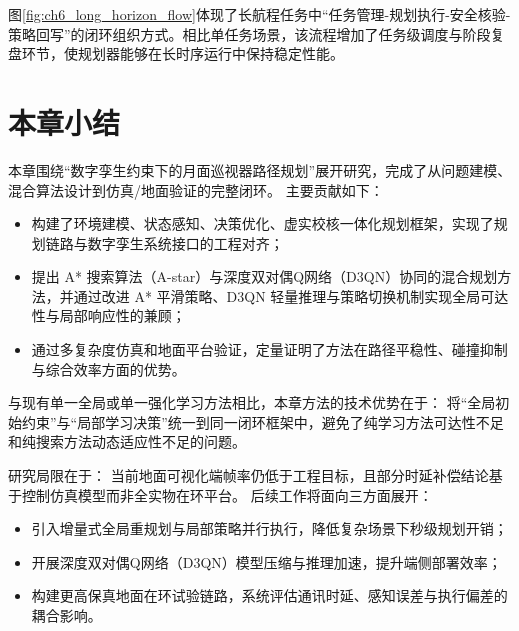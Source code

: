 \documentclass[UTF8,zihao=-4,a4paper,oneside,openany]{ctexrep}
\numberwithin{equation}{chapter}
\theoremstyle{plain}
\theoremstyle{definition}
\newenvironment{myitemize}{\begin{itemize}[noitemsep,topsep=0pt]}{\end{itemize}}
\begin{document}
图\ref{fig:ch6_long_horizon_flow}体现了长航程任务中“任务管理-规划执行-安全核验-策略回写”的闭环组织方式。相比单任务场景，该流程增加了任务级调度与阶段复盘环节，使规划器能够在长时序运行中保持稳定性能。

\section{本章小结}
\label{sec:ch6_summary}

本章围绕“数字孪生约束下的月面巡视器路径规划”展开研究，完成了从问题建模、混合算法设计到仿真/地面验证的完整闭环。
主要贡献如下：
\begin{myitemize}
\item 构建了环境建模、状态感知、决策优化、虚实校核一体化规划框架，实现了规划链路与数字孪生系统接口的工程对齐；
\item 提出 A* 搜索算法（A-star）与深度双对偶Q网络（D3QN）协同的混合规划方法，并通过改进 A* 平滑策略、D3QN 轻量推理与策略切换机制实现全局可达性与局部响应性的兼顾；
\item 通过多复杂度仿真和地面平台验证，定量证明了方法在路径平稳性、碰撞抑制与综合效率方面的优势。
\end{myitemize}

与现有单一全局或单一强化学习方法相比，本章方法的技术优势在于：
将“全局初始约束”与“局部学习决策”统一到同一闭环框架中，避免了纯学习方法可达性不足和纯搜索方法动态适应性不足的问题。

研究局限在于：
当前地面可视化端帧率仍低于工程目标，且部分时延补偿结论基于控制仿真模型而非全实物在环平台。
后续工作将面向三方面展开：
\begin{myitemize}
\item 引入增量式全局重规划与局部策略并行执行，降低复杂场景下秒级规划开销；
\item 开展深度双对偶Q网络（D3QN）模型压缩与推理加速，提升端侧部署效率；
\item 构建更高保真地面在环试验链路，系统评估通讯时延、感知误差与执行偏差的耦合影响。
\end{myitemize}
\end{document}
